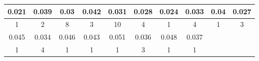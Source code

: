 \begin{tabular}{|c|c|c|c|c|c|c|c|c|c|}
    \hline
    0.021 & 0.039 & 0.03 & 0.042 & 0.031 & 0.028 & 0.024 & 0.033 & 0.04 & 0.027\\
    \hline
    1 & 2 & 8 & 3 & 10 & 4 & 1 & 4 & 1 & 3\\
    \hline
    [1ex]
    \hline
    0.045 & 0.034 & 0.046 & 0.043 & 0.051 & 0.036 & 0.048 & 0.037\\
    \hline
    1 & 4 & 1 & 1 & 1 & 3 & 1 & 1\\
    \hline
    [1ex]
\end{tabular}